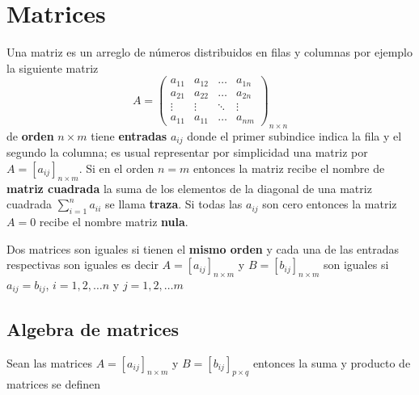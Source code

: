\documentclass[10pt,]{krantz}
\theoremstyle{definition}
\theoremstyle{definition}
\theoremstyle{definition}
\theoremstyle{remark}
\begin{document}
\hypertarget{matrices}{%
\chapter{Matrices}\label{matrices}}

Una matriz es un arreglo de números distribuidos en filas y columnas por ejemplo la siguiente matriz
\[A=\begin{pmatrix}
a_{11}&a_{12}&\ldots&a_{1n}\\
a_{21}&a_{22}&\ldots&a_{2n}\\
\vdots & \vdots & \ddots &\vdots \\
a_{11}&a_{11}&\ldots&a_{nm}
\end{pmatrix}_{n\times n}\]
de \textbf{orden} \(n\times m\) tiene \textbf{entradas} \(a_{ij}\) donde el primer subindice indica la fila y el segundo la columna; es usual representar por simplicidad una matriz por \(A=[a_{ij}]_{n\times m}\). Si en el orden \(n=m\) entonces la matriz recibe el nombre de \textbf{matriz cuadrada} la suma de los elementos de la diagonal de una matriz cuadrada \(\sum_{i=1}^na_{ii}\) se llama \textbf{traza}. Si todas las \(a_{ij}\) son cero entonces la matriz \(A=0\) recibe el nombre matriz \textbf{nula}.

Dos matrices son iguales si tienen el \textbf{mismo orden} y cada una de las entradas respectivas son iguales es decir \(A=[a_{ij}]_{n\times m}\) y \(B=[b_{ij}]_{n\times m}\) son iguales si \(a_{ij}=b_{ij}\), \(i=1,2,\ldots n\) y \(j=1,2,\ldots m\)

\hypertarget{algebra-de-matrices}{%
\section{Algebra de matrices}\label{algebra-de-matrices}}

Sean las matrices \(A=[a_{ij}]_{n\times m}\) y \(B=[b_{ij}]_{p\times q}\) entonces la suma y producto de matrices se definen
\end{document}
